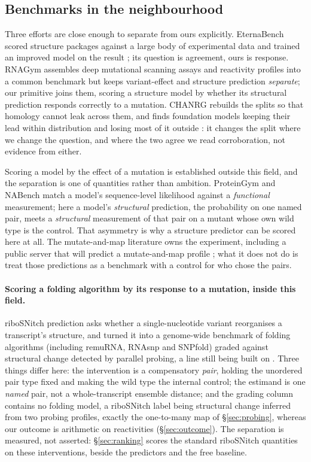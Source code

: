 \documentclass[11pt]{article}
\begin{document}
\subsection{Benchmarks in the neighbourhood}
Three efforts are close enough to separate from ours explicitly. EternaBench scored structure
packages against a large body of experimental data and trained an improved model on the result
\citep{waymentsteele2022rna}; its question is agreement, ours is response. RNAGym assembles deep
mutational scanning assays and reactivity profiles into a common benchmark \citep{rnagym2025} but
keeps variant-effect and structure prediction \emph{separate}; our primitive joins them, scoring a
structure model by whether its structural prediction responds correctly to a mutation. CHANRG
rebuilds the splits so that homology cannot leak across them, and finds foundation models keeping
their lead within distribution and losing most of it outside \citep{chanrg2026}: it changes the
split where we change the question, and where the two agree we read corroboration, not evidence
from either.

Scoring a model by the effect of a mutation is established outside this field, and the separation
is one of quantities rather than ambition. ProteinGym \citep{proteingym2023} and NABench
\citep{nabench2025} match a model's sequence-level likelihood against a \emph{functional}
measurement; here a model's \emph{structural} prediction, the probability on one named pair, meets
a \emph{structural} measurement of that pair on a mutant whose own wild type is the control. That
asymmetry is why a structure predictor can be scored here at all. The mutate-and-map literature owns the experiment, including a public server
that will predict a mutate-and-map profile \citep{ribonanzanet2024}; what it does not do is treat
those predictions as a benchmark with a control for who chose the pairs.

\paragraph{Scoring a folding algorithm by its response to a mutation, inside this field.}
riboSNitch prediction asks whether a single-nucleotide variant reorganises a transcript's
structure, and \citet{corley2015ribosnitch} turned it into a genome-wide benchmark of folding
algorithms (including remuRNA, RNAsnp and SNPfold) graded against structural change detected by
parallel probing, a line still being built on \citep{kirven2025variantfold}. Three things differ
here: the intervention is a compensatory \emph{pair}, holding the unordered pair type fixed and
making the wild type the internal control; the estimand is one \emph{named} pair, not a
whole-transcript ensemble distance; and the grading column contains no folding model, a riboSNitch
label being structural change inferred from two probing profiles, exactly the one-to-many map of
\S\ref{sec:probing}, whereas our outcome is arithmetic on reactivities (\S\ref{sec:outcome}). The
separation is measured, not asserted: \S\ref{sec:ranking} scores the standard riboSNitch
quantities on these interventions, beside the predictors and the free baseline.
\end{document}
